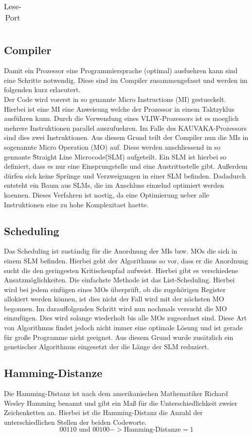 \begin{table}[htbp]
\begin{minipage}{.4\textwidth}
\begin{tabular}{cccccccccccccccccc}
		\end{tabular}
		\caption{\label{lese-port}Lese-Port}
	\end{minipage}
\end{table}


\subsection{Compiler}
Damit ein Prozessor eine Programmiersprache (optimal) ausfuehren kann sind eine Schritte notwendig. Diese sind im Compiler zusammengefasst und werden im folgenden kurz erlaeutert.\\
Der Code wird vorerst in so genannte Micro Instructions (MI) gestueckelt.  Hierbei ist eine MI eine Anweisung welche der Prozessor in einem Taktzyklus ausführen kann. Durch die Verwendung eines VLIW-Prozessors ist es moeglich mehrere Instruktionen parallel auszufuehren. Im Falle des KAUVAKA-Prozessors sind dies zwei Instruktionen. Aus diesem Grund teilt der Compiler nun die MIs in sogenannte Micro Operation (MO) auf. Diese werden anschliessend in so gennante \"Straight Line Microcode\" (SLM) aufgeteilt. Ein SLM ist hierbei so definiert, dass es nur eine Einsprungstelle und eine Austrittsstelle gibt. Außerdem dürfen sich keine Sprünge und Verzweigungen in einer SLM befinden.  Dadadurch entsteht ein Baum aus SLMs, die im Anschluss einzelnd optimiert werden koennen. Dieses Verfahren ist noetig, da eine Optimierung ueber alle Instruktionen eine zu hohe Komplexitaet haette. 
\subsection{Scheduling}
Das Scheduling ist zuständig für die Anordnung der MIs bzw. MOs die sich in einem SLM befinden. Hierbei geht der Algorithmus so vor, dass er die Anordnung sucht die den geringesten Kritischenpfad aufweist. Hierbei gibt es verschiedene Ansatzmöglichkeiten. Die einfachste Methode ist das List-Scheduling. Hierbei wird bei jedem einfügen eines MOs überprüft, ob die zugehörigen Register allokiert werden können, ist dies nicht der Fall wird mit der nächsten MO begonnen. Im darauffolgenden Schritt wird nun nochmals versucht die MO einzufügen. Dies wird solange wiederholt bis alle MOs zugeordnet sind.
Diese Art von Algorithmus findet jedoch nicht immer eine optimale Lösung und ist gerade für große Programme nicht geeignet. Aus diesem Grund wurde zusätzlich ein genetischer Algorithmus eingesetzt der die Länge der SLM reduziert.
\subsection{Hamming-Distanze}
Die Hamming-Distanz ist nach dem amerikanischen Mathematiker Richard Wesley Hamming benannt und gibt ein Maß für die Unterschiedlichkeit zweier Zeichenketten an. Hierbei ist die Hamming-Distanz die Anzahl der unterschiedlichen Stellen der beiden Codeworte.
\begin{equation}
	00110 \text{ und } 00100 -> \text{Hamming-Distanze}= 1
	\label{eq:hammingdistanze}
\end{equation}

